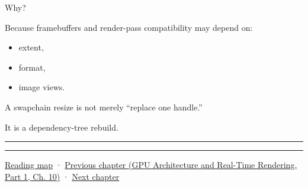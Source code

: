 Why?

Because framebuffers and render-pass compatibility may depend on:

\begin{itemize}
\tightlist
\item
  extent,
\item
  format,
\item
  image views.
\end{itemize}

A swapchain resize is not merely ``replace one handle.''

It is a dependency-tree rebuild.

\begin{center}\rule{0.5\linewidth}{0.5pt}\end{center}

\begin{center}\rule{0.5\linewidth}{0.5pt}\end{center}

\hyperref[volume-reading-map]{Reading map} · \href{../06-GPU-Architecture-and-Real-Time-Rendering-P01/main.pdf\#05-engine-i-ch019-gpu-work-and-reusable-metal-frames}{Previous chapter (GPU Architecture and Real-Time Rendering, Part 1, Ch. 10)} · \hyperref[05-engine-i-ch021-buffers-images-memory-and-uploads]{Next chapter}
